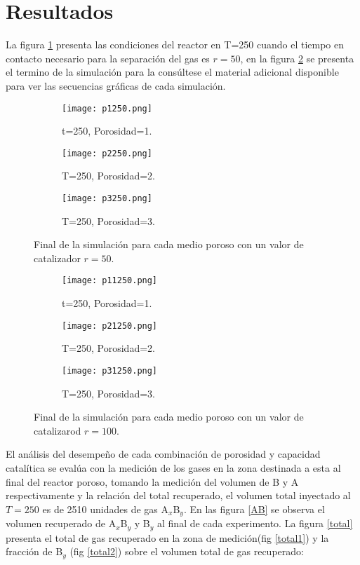 \documentclass{article}
\begin{document}
\section{Resultados}
La figura \ref{reaccion} presenta las condiciones del reactor en T=250 cuando el tiempo en contacto necesario para la separación del gas es $r=50$, en la figura \ref{reaccion2} se presenta el termino de la simulación para la  consúltese el material adicional disponible \cite{REPOPPF} para ver las secuencias gráficas de cada simulación.
\begin{figure}
\centering
     \begin{subfigure}[]{.3\linewidth}
         \texttt{[image: p1250.png]}
         \caption{t=250, Porosidad=1.}
       
     \end{subfigure}
     \begin{subfigure}[]{.3\linewidth}
         \texttt{[image: p2250.png]}
         \caption{T=250, Porosidad=2.}
        
     \end{subfigure}
      \begin{subfigure}[]{.3\linewidth}
         \texttt{[image: p3250.png]}
         \caption{T=250, Porosidad=3.}
         
     \end{subfigure}
     \caption{Final de la simulación para cada medio poroso con un valor de catalizador $r=50$.}
        \label{reaccion}
\end{figure}
\begin{figure}
\centering
     \begin{subfigure}[]{.3\linewidth}
         \texttt{[image: p11250.png]}
         \caption{t=250, Porosidad=1.}
        
     \end{subfigure}
     \begin{subfigure}[]{.3\linewidth}
         \texttt{[image: p21250.png]}
         \caption{T=250, Porosidad=2.}
         
     \end{subfigure}
      \begin{subfigure}[]{.3\linewidth}
         \texttt{[image: p31250.png]}
         \caption{T=250, Porosidad=3.}
         
     \end{subfigure}
     \caption{Final de la simulación para cada medio poroso con un valor de catalizarod $r=100$.}
        \label{reaccion2}
\end{figure}
El análisis del desempeño de cada combinación de porosidad y capacidad catalítica se evalúa con la medición de los gases en la zona destinada a esta al final del reactor poroso, tomando la medición del volumen de B y A respectivamente y la relación del total recuperado, el volumen total inyectado al $T=250$ es de 2510 unidades de gas A$_x$B$_y$. En las figura \ref{AB} se observa el volumen recuperado de A$_x$B$_y$ y B$_y$ al final de cada experimento. La figura \ref{total} presenta el total de gas recuperado en la zona de medición(fig \ref{total1}) y la fracción de B$_y$ (fig \ref{total2}) sobre el volumen total de gas recuperado:
\end{document}
